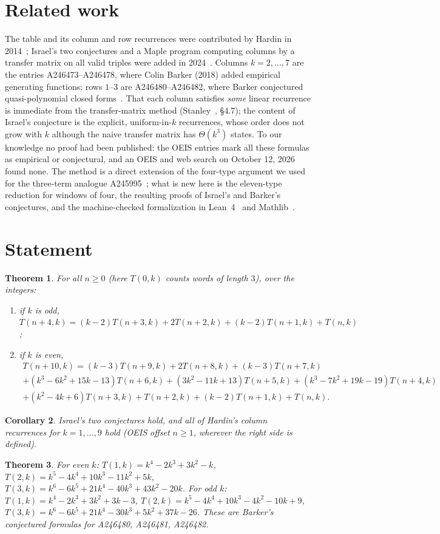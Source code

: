 \documentclass[11pt]{article}
\newtheorem{theorem}{Theorem}
\newtheorem{corollary}[theorem]{Corollary}
\theoremstyle{remark}\newtheorem{remark}[theorem]{Remark}
\begin{document}
\section{Related work}
The table and its column and row recurrences were contributed by Hardin in 2014~\cite{oeis}; Israel's two conjectures and a Maple program computing columns by a transfer matrix on all valid triples were added in 2024~\cite{oeis}. Columns $k=2,\dots,7$ are the entries A246473--A246478, where Colin Barker (2018) added empirical generating functions; rows $1$--$3$ are A246480--A246482, where Barker conjectured quasi-polynomial closed forms~\cite{oeisrel}. That each column satisfies \emph{some} linear recurrence is immediate from the transfer-matrix method (Stanley~\cite{stanley}, \S4.7); the content of Israel's conjecture is the explicit, uniform-in-$k$ recurrences, whose order does not grow with $k$ although the naive transfer matrix has $\Theta(k^3)$ states. To our knowledge no proof had been published: the OEIS entries mark all these formulas as empirical or conjectural, and an OEIS and web search on October 12, 2026 found none. The method is a direct extension of the four-type argument we used for the three-term analogue A245995~\cite{a245995}; what is new here is the eleven-type reduction for windows of four, the resulting proofs of Israel's and Barker's conjectures, and the machine-checked formalization in Lean~4~\cite{lean4} and Mathlib~\cite{mathlib}.

\section{Statement}
\begin{theorem}\label{thm:main}
For all $n\ge0$ (here $T(0,k)$ counts words of length $3$), over the integers:
\begin{enumerate}
\item if $k$ is odd, $T(n+4,k)=(k-2)T(n+3,k)+2T(n+2,k)+(k-2)T(n+1,k)+T(n,k)$;
\item if $k$ is even,
\begin{multline*}
T(n+10,k)=(k-3)T(n+9,k)+2T(n+8,k)+(k-3)T(n+7,k)\\+(k^3-6k^2+15k-13)T(n+6,k)
+(3k^2-11k+13)T(n+5,k)+(k^3-7k^2+19k-19)T(n+4,k)\\+(k^2-4k+6)T(n+3,k)
+T(n+2,k)+(k-2)T(n+1,k)+T(n,k).
\end{multline*}
\end{enumerate}
\end{theorem}
\begin{corollary}\label{cor:cols}
Israel's two conjectures hold, and all of Hardin's column recurrences for $k=1,\dots,9$ hold (OEIS offset $n\ge1$, wherever the right side is defined).
\end{corollary}
\begin{theorem}\label{thm:rows}
For even $k$: $T(1,k)=k^4-2k^3+3k^2-k$, $T(2,k)=k^5-4k^4+10k^3-11k^2+5k$, $T(3,k)=k^6-6k^5+21k^4-40k^3+43k^2-20k$. For odd $k$: $T(1,k)=k^4-2k^3+3k^2+3k-3$, $T(2,k)=k^5-4k^4+10k^3-4k^2-10k+9$, $T(3,k)=k^6-6k^5+21k^4-30k^3+5k^2+37k-26$. These are Barker's conjectured formulas for A246480, A246481, A246482.
\end{theorem}
\end{document}
